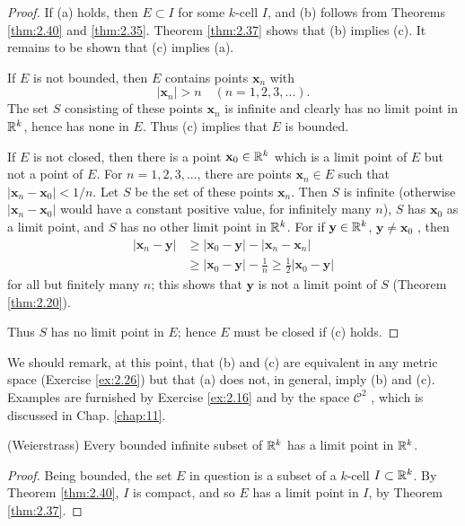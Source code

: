 
\begin{proof}
    If (a) holds, then $E \subset I$ for some $k$-cell $I$,
    and (b) follows from Theorems \ref{thm:2.40} and \ref{thm:2.35}.
    Theorem \ref{thm:2.37} shows that (b) implies (c).
    It remains to be shown that (c) implies (a).

    If $E$ is not bounded, then $E$ contains points $\mathbf{x}_n$ with
    \begin{equation*}
        \left| \mathbf{x}_n \right| > n
        \quad
        (n = 1, 2, 3, ... ).
    \end{equation*}
    The set $S$ consisting of these points $\mathbf{x}_n$ is infinite and clearly has no limit point in ${\protect\mathbb R}^{k}$, hence has none in $E$.
    Thus (c) implies that $E$ is bounded.

    If $E$ is not closed, then there is a point $\mathbf{x}_0 \in  {\protect\mathbb R}^{k}$ which is a limit point of $E$ but not a point of $E$.
    For $n = 1, 2, 3, ... $, there are points $\mathbf{x}_n \in E$
    such that $\left| \mathbf{x}_n - \mathbf{x}_0 \right| < 1/n$.
    Let $S$ be the set of these points $\mathbf{x}_n$.
    Then $S$ is infinite (otherwise $\left| \mathbf{x}_n - \mathbf{x}_0 \right| $ would have a constant positive value, for infinitely many $n$),
    $S$ has $\mathbf{x}_0$ as a limit point,
    and $S$ has no other limit point in ${\protect\mathbb R}^{k}$.
    For if $\mathbf{y} \in {\protect\mathbb R}^{k}$, $\mathbf{y} \neq \mathbf{x}_0$ , then
    \begin{align*}
        \left| \mathbf{x}_n - \mathbf{y} \right|
         & \geq
        \left| \mathbf{x}_0 - \mathbf{y} \right| -
        \left| \mathbf{x}_n - \mathbf{x}_n \right| \\
         & \geq
        \left| \mathbf{x}_0 - \mathbf{y} \right| - \frac{1}{n}
        \geq \frac{1}{2}
        \left| \mathbf{x}_0 - \mathbf{y} \right|
    \end{align*}
    for all but finitely many $n$;
    this shows that $\mathbf{y}$ is not a limit point of $S$ (Theorem \ref{thm:2.20}).

    Thus $S$ has no limit point in $E$; hence $E$ must be closed if (c) holds.
\end{proof}

We should remark, at this point, that (b) and (c) are equivalent in any
metric space (Exercise \ref{ex:2.26}) but that (a) does not, in general, imply (b) and (c).
Examples are furnished by Exercise \ref{ex:2.16} and by the space $\mathscr{C}^2$ , which is discussed in Chap. \ref{chap:11}.

\begin{thm}(Weierstrass)
    \label{thm:2.42}
    Every bounded infinite subset of ${\protect\mathbb R}^k$ has a limit point in ${\protect\mathbb R}^k$.
\end{thm}
\begin{proof}
    Being bounded, the set $E$ in question is a subset of a $k$-cell $I\subset {\protect\mathbb R}^k$.
    By Theorem \ref{thm:2.40}, $I$ is compact,
    and so $E$ has a limit point in $I$, by Theorem \ref{thm:2.37}.
\end{proof}